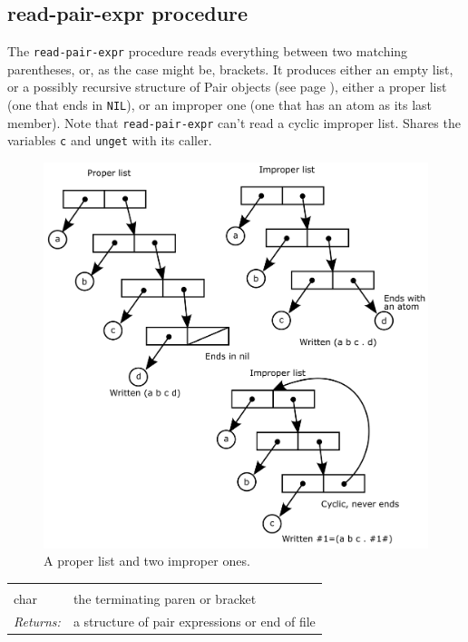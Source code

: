 \documentclass[a5paper,draft]{memoir}
\begin{document}
\subsection{read-pair-expr procedure}
\label{readpairexpr-procedure}

The \texttt{read-pair-expr} procedure reads everything between two matching parentheses, or, as the case might be, brackets. It produces either an empty list, or a possibly recursive structure of Pair objects (see page \pageref{pairs-and-lists}), either a proper list (one that ends in \texttt{NIL}), or an improper one (one that has an atom as its last member). Note that \texttt{read-pair-expr} can't read a cyclic improper list. Shares the variables \texttt{c} and \texttt{unget} with its caller.

\begin{figure}[h!]\includegraphics{images/prop-improp.png}\captionsetup{labelformat=empty}\caption{A proper list and two improper ones.}\label{fig:a-proper-list-and-two-improper-ones}\end{figure}

\noindent\begin{tabular}{ |p{1.9cm} p{6.5cm}| }
\hline
\rowcolor[HTML]{CCCCCC} \multicolumn{2}{|l|}{\textbf{read-pair-expr (internal)}} \\
char & the terminating paren or bracket \\
\textit{Returns:} & a structure of pair expressions or end of file \\
\hline
\end{tabular}
\end{document}
